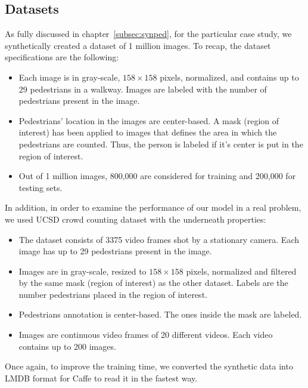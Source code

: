 \subsection{Datasets} 

As fully discussed in chapter~\ref{subsec:synped}, for the particular case study, we synthetically created a dataset of 1 million images. To recap, the dataset specifications are the following:
\begin{itemize}
\item Each image is in gray-scale, $158\times158$ pixels, normalized, and contains up to 29 pedestrians in a walkway. Images are labeled with the number of pedestrians present in the image.  
\item Pedestrians' location in the images are center-based. A mask (region of interest) has been applied to images that defines the area in which the pedestrians are counted. Thus, the person is labeled if it's center is put in the region of interest.   
\item Out of 1 million images, 800,000 are considered for training and 200,000 for testing sets.
\end{itemize} 

\noindent In addition, in order to examine the performance of our model in a real problem, we used UCSD crowd counting dataset \cite{chan2008privacy} with the underneath properties:

\begin{itemize}
\item The dataset consists of 3375 video frames shot by a stationary camera. Each image has up to 29 pedestrians present in the image.
\item Images are in gray-scale, resized to $158\times158$ pixels, normalized and filtered by the same mask (region of interest) as the other dataset. Labels are the number pedestrians placed in the region of interest.
\item Pedestrians annotation is center-based. The ones inside the mask are labeled.  
\item Images are continuous video frames of 20 different videos. Each video contains up to 200 images.  
\end{itemize}

Once again, to improve the training time, we converted the synthetic data into LMDB format for Caffe to read it in the fastest way.


